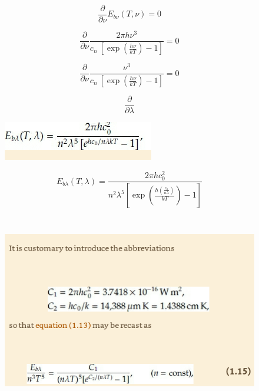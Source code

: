 \documentclass[12pt]{article}
\renewcommand{\_}{\kern-1.5pt\textunderscore\kern-1.5pt}
\begin{document}
\begin{itemize}
 \[ \frac{ \partial }{ \partial  \nu }E_{b \nu } \left( T, \nu  \right) =0 \] \par

 \[ \frac{ \partial }{ \partial  \nu }\frac{2 \pi h \nu ^{3}}{c_{n}~ \left[ \exp  \left( \frac{h \nu }{kT} \right) -1 \right] }=0 \] \par

 \[ \frac{ \partial }{ \partial  \nu }\frac{ \nu ^{3}}{c_{n}~ \left[ \exp  \left( \frac{h \nu }{kT} \right) -1 \right] }=0 \] \par

 \[ \frac{ \partial }{ \partial  \lambda } \] \par




\begin{figure}[H]
	\begin{Center}
		\includegraphics[width=2.59in,height=0.67in]{./media/image10.png}
	\end{Center}
\end{figure}



\par

 \[ E_{b \lambda } \left( T, \lambda  \right) =\frac{2 \pi hc_{0}^{2}}{n^{2} \lambda ^{5} \left[ \exp  \left( \frac{h \left( \frac{c_{0}}{n \lambda } \right) }{kT} \right) -1 \right] } \] \par




\begin{figure}[H]
	\begin{Center}
		\includegraphics[width=5.43in,height=3.31in]{./media/image11.png}
	\end{Center}
\end{figure}



\end{itemize}
\end{document}
